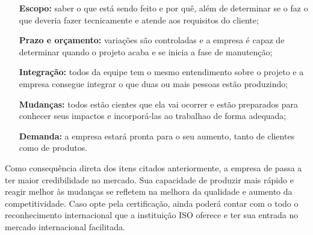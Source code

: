 \begin{itemize}

\item [\textbf{Escopo:}] saber o que está sendo feito e por quê, além de determinar se  o \sw faz o que deveria fazer tecnicamente e atende aos requisitos do cliente;

\item [\textbf{Prazo e orçamento:}] variações são controladas e a empresa é capaz de determinar quando o projeto acaba e se inicia a fase de manutenção;

\item [\textbf{Integração:}] todos da equipe tem o mesmo entendimento sobre o projeto e a empresa consegue integrar o que duas ou mais pessoas estão produzindo;

\item [\textbf{Mudanças:}] todos estão cientes que ela vai ocorrer e estão preparados para conhecer seus impactos e incorporá-las ao trabalhao de forma adequada;

\item [\textbf{Demanda:}] a empresa estará pronta para o seu aumento, tanto de clientes como de produtos.

\end{itemize}

Como consequência direta dos itens citados anteriormente, a empresa de \sw passa a ter maior credibilidade no mercado. Sua capacidade de produzir mais rápido e reagir melhor às mudanças se refletem na melhora da qualidade e aumento da competitividade. Caso opte pela certificação, ainda poderá contar com o todo o reconhecimento internacional que a instituição ISO oferece e ter sua entrada no mercado internacional facilitada.